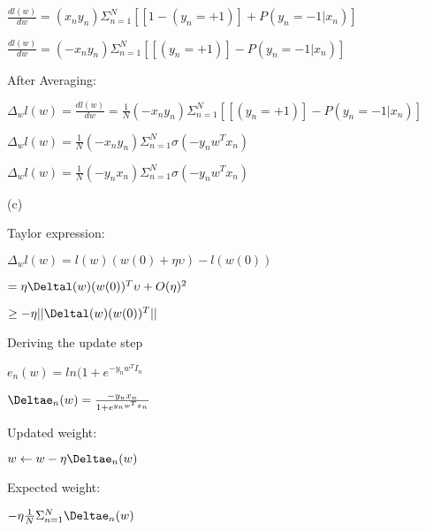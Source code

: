 \documentclass[12pt]{article}
\begin{document}
$\frac{dl(w)}{dw} =(x_ny_n)\Sigma_{n=1}^N[[1-(y_n = +1)]+P(y_n =-1|x_n)]$

$\frac{dl(w)}{dw} =(-x_ny_n)\Sigma_{n=1}^N[[(y_n = +1)]-P(y_n =-1|x_n)]$

After Averaging:

$\Delta_{w}l(w)= \frac{dl(w)}{dw} = \frac{1}{N}(-x_ny_n)\Sigma_{n=1}^N[[(y_n = +1)]-P(y_n =-1|x_n)]$

$\Delta_{w}l(w)= \frac{1}{N}(-x_ny_n)\Sigma_{n=1}^N\sigma(-y_nw^Tx_n)$

$\Delta_{w}l(w)= \frac{1}{N}(-y_nx_n)\Sigma_{n=1}^N\sigma(-y_nw^Tx_n)$


(c)


Taylor expression:

$\Delta_{w}l(w)=l(w)(w(0)+ \eta\upsilon)-l(w(0))$

$ = \eta\Deltal(w)(w(0))^T\upsilon + O(\eta)^2 $

$\geq-\eta||\Deltal(w)(w(0))^T||$

Deriving the update step

$e_n(w)=ln(1+e^{-y_nw^{T}I_n}$

$\Deltae_n(w)=\frac{-y_nx_n}{1+e^{y_nw^Tx_n}}$

Updated weight:

$w\leftarrow w-\eta\Deltae_n(w)$

Expected weight:

$ -\eta\frac{1}{N}\Sigma_{n=1}^N\Deltae_n(w)$
\end{document}
